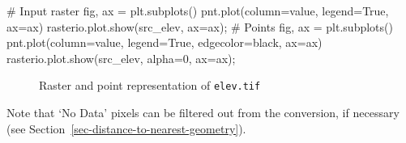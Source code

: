 \documentclass[
  letterpaper,
]{krantz}
\newenvironment{Shaded}{\begin{snugshade}}{\end{snugshade}}
\newcommand{\CommentTok}[1]{\textcolor[rgb]{0.37,0.37,0.37}{#1}}
\newcommand{\DecValTok}[1]{\textcolor[rgb]{0.68,0.00,0.00}{#1}}
\newcommand{\NormalTok}[1]{\textcolor[rgb]{0.00,0.23,0.31}{#1}}
\newcommand{\OperatorTok}[1]{\textcolor[rgb]{0.37,0.37,0.37}{#1}}
\newcommand{\StringTok}[1]{\textcolor[rgb]{0.13,0.47,0.30}{#1}}
\newcommand{\VariableTok}[1]{\textcolor[rgb]{0.07,0.07,0.07}{#1}}
\begin{document}
\begin{Shaded}
\begin{Highlighting}[]
\CommentTok{\# Input raster}
\NormalTok{fig, ax }\OperatorTok{=}\NormalTok{ plt.subplots()}
\NormalTok{pnt.plot(column}\OperatorTok{=}\StringTok{\textquotesingle{}value\textquotesingle{}}\NormalTok{, legend}\OperatorTok{=}\VariableTok{True}\NormalTok{, ax}\OperatorTok{=}\NormalTok{ax)}
\NormalTok{rasterio.plot.show(src\_elev, ax}\OperatorTok{=}\NormalTok{ax)}\OperatorTok{;}
\CommentTok{\# Points}
\NormalTok{fig, ax }\OperatorTok{=}\NormalTok{ plt.subplots()}
\NormalTok{pnt.plot(column}\OperatorTok{=}\StringTok{\textquotesingle{}value\textquotesingle{}}\NormalTok{, legend}\OperatorTok{=}\VariableTok{True}\NormalTok{, edgecolor}\OperatorTok{=}\StringTok{\textquotesingle{}black\textquotesingle{}}\NormalTok{, ax}\OperatorTok{=}\NormalTok{ax)}
\NormalTok{rasterio.plot.show(src\_elev, alpha}\OperatorTok{=}\DecValTok{0}\NormalTok{, ax}\OperatorTok{=}\NormalTok{ax)}\OperatorTok{;}
\end{Highlighting}
\end{Shaded}

\begin{figure}

\begin{minipage}{0.50\linewidth}



\end{minipage}%
%
\begin{minipage}{0.50\linewidth}



\end{minipage}%

\caption{\label{fig-raster-to-points}Raster and point representation of
\texttt{elev.tif}}

\end{figure}%

Note that `No Data' pixels can be filtered out from the conversion, if
necessary (see Section~\ref{sec-distance-to-nearest-geometry}).
\end{document}
